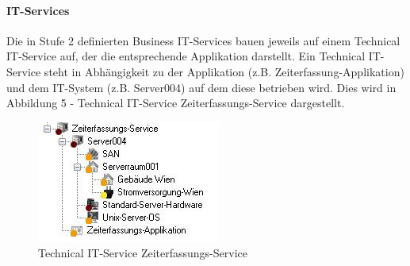 \paragraph{IT-Services}
Die in Stufe 2 definierten Business IT-Services bauen jeweils auf einem Technical IT-Service auf, der die entsprechende Applikation darstellt. Ein Technical IT-Service steht in Abhängigkeit zu der Applikation (z.B. Zeiterfassung-Applikation) und dem IT-System (z.B. Server004) auf dem diese betrieben wird. Dies wird in Abbildung 5 - Technical IT-Service Zeiterfassungs-Service dargestellt.
\newpage
\begin{figure}[htbp]
	\centering
	\includegraphics[scale =1 ]{images/Technical.png}
	\caption{Technical IT-Service Zeiterfassungs-Service}
	\label{fig:bsp}
\end{figure}
